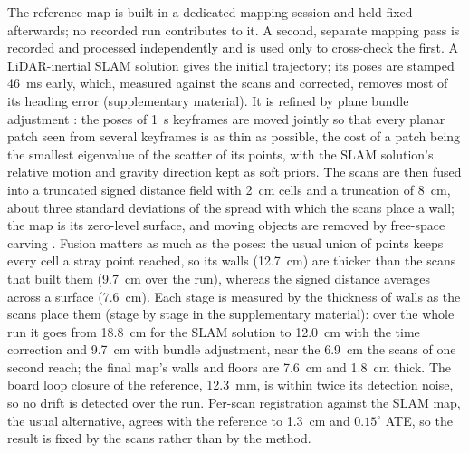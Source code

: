 The reference map is built in a dedicated mapping session and held fixed
afterwards; no recorded run contributes to it. A second, separate mapping
pass is recorded and processed independently and is used only to
cross-check the first. A LiDAR-inertial SLAM solution \cite{glim} gives the
initial trajectory; its poses are stamped \SI{46}{\milli\second} early,
which, measured against the scans and corrected, removes most of its
heading error (supplementary material). It is refined by plane
bundle adjustment \cite{balm,hba}: the poses of \SI{1}{\second} keyframes
are moved jointly so that every planar patch seen from several keyframes is
as thin as possible, the cost of a patch being the smallest eigenvalue of
the scatter of its points, with the SLAM solution's relative motion and
gravity direction kept as soft priors. The scans are then fused into a
truncated signed distance field \cite{curless1996,vdbfusion} with
\SI{2}{\centi\metre} cells and a truncation of \SI{8}{\centi\metre}, about
three standard deviations of the spread with which the scans place a wall;
the map is its zero-level surface, and moving objects are removed by
free-space carving \cite{dufomap}. Fusion matters as much as the poses: the
usual union of points keeps every cell a stray point reached, so its walls
(\SI{12.7}{\centi\metre}) are thicker than the scans that built them
(\SI{9.7}{\centi\metre} over the run), whereas the signed distance averages
across a surface (\SI{7.6}{\centi\metre}). Each stage is measured by the
thickness of walls as the scans place them (stage by stage in the supplementary material):
over the whole run it goes from \SI{18.8}{\centi\metre} for the SLAM
solution to \SI{12.0}{\centi\metre} with the time correction and
\SI{9.7}{\centi\metre} with bundle adjustment, near the
\SI{6.9}{\centi\metre} the scans of one second reach; the final map's
walls and floors are \SI{7.6}{\centi\metre} and \SI{1.8}{\centi\metre}
thick. The board loop closure of the reference, \SI{12.3}{\milli\metre},
is within twice its detection noise, so no drift is detected over the run.
Per-scan registration against the SLAM map, the usual alternative,
agrees with the reference to \SI{1.3}{\centi\metre} and $0.15^\circ$
ATE, so the result is fixed by the scans rather than by the method.
